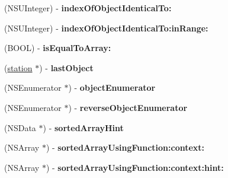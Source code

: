 \begin{DoxyCompactItemize}
\item 
\hypertarget{interfaceget_stations_response_ac1922f7beb3aad43d9f3f1b75cc5ad84}{}(N\+S\+U\+Integer) -\/ {\bfseries index\+Of\+Object\+Identical\+To\+:}\label{interfaceget_stations_response_ac1922f7beb3aad43d9f3f1b75cc5ad84}

\item 
\hypertarget{interfaceget_stations_response_afda9285fdc308a7561e6131199678651}{}(N\+S\+U\+Integer) -\/ {\bfseries index\+Of\+Object\+Identical\+To\+:in\+Range\+:}\label{interfaceget_stations_response_afda9285fdc308a7561e6131199678651}

\item 
\hypertarget{interfaceget_stations_response_a1a20d7138f5b6abd74db0465036944ff}{}(B\+O\+O\+L) -\/ {\bfseries is\+Equal\+To\+Array\+:}\label{interfaceget_stations_response_a1a20d7138f5b6abd74db0465036944ff}

\item 
\hypertarget{interfaceget_stations_response_ae3628096476af8da9152cacd93248602}{}(\hyperlink{interfacestation}{station} $\ast$) -\/ {\bfseries last\+Object}\label{interfaceget_stations_response_ae3628096476af8da9152cacd93248602}

\item 
\hypertarget{interfaceget_stations_response_a91daf66f7321cb4a50b7dd5552840da2}{}(N\+S\+Enumerator $\ast$) -\/ {\bfseries object\+Enumerator}\label{interfaceget_stations_response_a91daf66f7321cb4a50b7dd5552840da2}

\item 
\hypertarget{interfaceget_stations_response_a6ee2185c0fe7dbde5f482d049891ce8a}{}(N\+S\+Enumerator $\ast$) -\/ {\bfseries reverse\+Object\+Enumerator}\label{interfaceget_stations_response_a6ee2185c0fe7dbde5f482d049891ce8a}

\item 
\hypertarget{interfaceget_stations_response_a41cd3589b6e1a4b11aeede09896f4127}{}(N\+S\+Data $\ast$) -\/ {\bfseries sorted\+Array\+Hint}\label{interfaceget_stations_response_a41cd3589b6e1a4b11aeede09896f4127}

\item 
\hypertarget{interfaceget_stations_response_a4db8f9a87b6d46544bca47775925538a}{}(N\+S\+Array $\ast$) -\/ {\bfseries sorted\+Array\+Using\+Function\+:context\+:}\label{interfaceget_stations_response_a4db8f9a87b6d46544bca47775925538a}

\item 
\hypertarget{interfaceget_stations_response_abe53a2e89107bd1ecddcb8c2b0f3c050}{}(N\+S\+Array $\ast$) -\/ {\bfseries sorted\+Array\+Using\+Function\+:context\+:hint\+:}\label{interfaceget_stations_response_abe53a2e89107bd1ecddcb8c2b0f3c050}


\end{DoxyCompactItemize}
